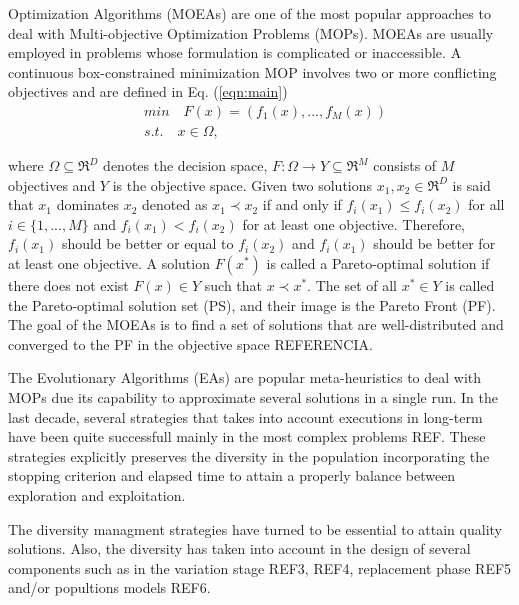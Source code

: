  Optimization Algorithms (MOEAs) are one of the most popular approaches to deal with Multi-objective Optimization Problems (MOPs).
%
MOEAs are usually employed in problems whose formulation is complicated or inaccessible.
%
A continuous box-constrained minimization MOP involves two or more conflicting objectives and are defined in Eq. (\ref{eqn:main})
\begin{equation}\label{eqn:main}
\begin{split}
&min \quad F(x) = (f_1(x), ..., f_M(x)) \\
&s.t. \quad x \in \Omega,
\end{split}
\end{equation}

where $\Omega \subseteq \Re^D$ denotes the decision space, $F: \Omega \rightarrow Y \subseteq \Re^M$ consists of $M$ objectives and $Y$ is the objective space.
%
Given two solutions $x_1, x_2 \in \Re^D$ is said that $x_1$ dominates $x_2$ denoted as $x_1 \prec x_2$ if and only if $f_i(x_1) \leq f_i(x_2)$ for all $i \in \{1,...,M\}$ and $f_i(x_1) < f_i(x_2)$ for at least one objective.
%
Therefore, $f_i(x_1)$ should be better or equal to $f_i(x_2)$ and $f_i(x_1)$ should be better for at least one objective.
%
A solution $F(x^*)$ is called a Pareto-optimal solution if there does not exist $F(x) \in Y$ such that $x \prec x^*$.
%
The set of all $x^* \in Y$ is called the Pareto-optimal solution set (PS), and their image is the Pareto Front (PF).
%
The goal of the MOEAs is to find a set of solutions that are well-distributed and converged to the PF in the objective space REFERENCIA.
%

The Evolutionary Algorithms (EAs) are popular meta-heuristics to deal with MOPs due its capability to approximate several solutions in a single run.
%
In the last decade, several strategies that takes into account executions in long-term have been quite successfull mainly in the most complex problems REF.
%
These strategies explicitly preserves the diversity in the population incorporating the stopping criterion and elapsed time to attain a properly balance between exploration and exploitation.
%

The diversity managment strategies have turned to be essential to attain quality solutions.
%
Also, the diversity has taken into account in the design of several components such as in the variation stage REF3, REF4, replacement phase REF5 and/or popultions models REF6.



